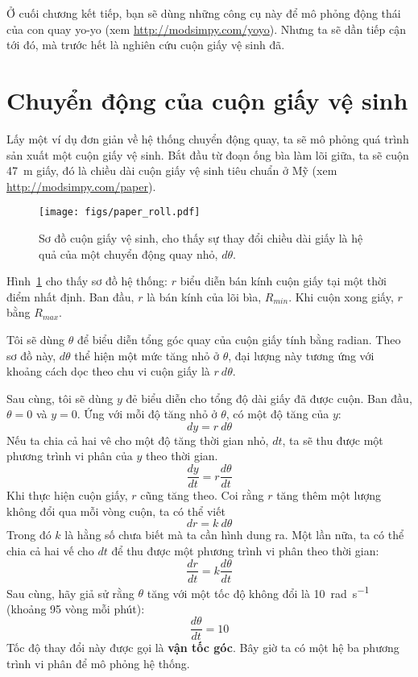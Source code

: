 \documentclass[12pt]{book}
\theoremstyle{exercise}
\begin{document}
Ở cuối chương kết tiếp, bạn sẽ dùng những công cụ này để mô phỏng động thái của con quay yo-yo (xem \url{http://modsimpy.com/yoyo}).  Nhưng ta sẽ dần tiếp cận tới đó, mà trước hết là nghiên cứu cuộn giấy vệ sinh đã.



\section{Chuyển động của cuộn giấy vệ sinh}
\label{paper}


Lấy một ví dụ đơn giản về hệ thống chuyển động quay, ta sẽ mô phỏng quá trình sản xuất một cuộn giấy vệ sinh. Bắt đầu từ đoạn ống bìa làm lõi giữa, ta sẽ cuộn \SI{47}{\meter} giấy, đó là chiều dài cuộn giấy vệ sinh tiêu chuẩn ở Mỹ (xem \url{http://modsimpy.com/paper}).


\begin{figure}
\centerline{\texttt{[image: figs/paper\_roll.pdf]}}
\caption{Sơ đồ cuộn giấy vệ sinh, cho thấy sự thay đổi chiều dài giấy là hệ quả của một chuyển động quay nhỏ, $d\theta$.}
\label{paper_roll}
\end{figure}

Hình~\ref{paper_roll} cho thấy sơ đồ hệ thống: $r$ biểu diễn bán kính cuộn giấy tại một thời điểm nhất định. Ban đầu, $r$ là bán kính của lõi bìa, $R_{min}$.  Khi cuộn xong giấy, $r$ bằng $R_{max}$.

Tôi sẽ dùng $\theta$ để biểu diễn tổng góc quay của cuộn giấy tính bằng radian. Theo sơ đồ này, $d\theta$ thể hiện một mức tăng nhỏ ở $\theta$, đại lượng này tương ứng với khoảng cách dọc theo chu vi cuộn giấy là $r~d\theta$.


Sau cùng, tôi sẽ dùng $y$ đẻ biểu diễn cho tổng độ dài giấy đã được cuộn. Ban đầu, $\theta=0$ và $y=0$.  Ứng với mỗi độ tăng nhỏ ở $\theta$, có một độ tăng của $y$:
%
\[ dy = r~d\theta \]
%
Nếu ta chia cả hai vê cho một độ tăng thời gian nhỏ, $dt$, ta sẽ thu được một phương trình vi phân của $y$ theo thời gian.
%
\[ \frac{dy}{dt} = r \frac{d\theta}{dt} \]
%
Khi thực hiện cuộn giấy, $r$ cũng tăng theo. Coi rằng $r$ tăng thêm một lượng không đổi qua mỗi vòng cuộn, ta có thể viết 
%
\[ dr = k~d\theta \]
%
Trong đó $k$ là hằng số chưa biết mà ta cần hình dung ra. Một lần nữa, ta có thể chia cả hai vế cho $dt$ để thu được một phương trình vi phân theo thời gian:
%
\[ \frac{dr}{dt} = k \frac{d\theta}{dt} \]
%
Sau cùng, hãy giả sử rằng $\theta$ tăng với một tốc độ không đổi là \SI{10}{\radian\per\second} (khoảng 95 vòng mỗi phút):
%
\[ \frac{d\theta}{dt} = 10  \]
%
Tốc độ thay đổi này được gọi là {\bf vận tốc góc}.  Bây giờ ta có một hệ ba phương trình vi phân để mô phỏng hệ thống.
\end{document}
